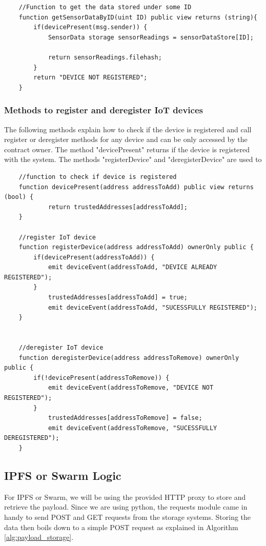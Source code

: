 \documentclass[11pt,openright]{report}
\begin{document}
\begin{verbatim}
    //Function to get the data stored under some ID
    function getSensorDataByID(uint ID) public view returns (string){
        if(devicePresent(msg.sender)) {
            SensorData storage sensorReadings = sensorDataStore[ID];

            return sensorReadings.filehash;
        }
        return "DEVICE NOT REGISTERED";
    }
\end{verbatim}

\subsubsection{Methods to register and deregister IoT devices}
The following methods explain how to check if the device is registered and call register or deregister methods for any device and can be only accessed by the contract owner. 
The method "devicePresent" returns if the device is registered with the system.
The methods "registerDevice" and "deregisterDevice" are used to 
\begin{verbatim}
    //function to check if device is registered
    function devicePresent(address addressToAdd) public view returns (bool) {
            return trustedAddresses[addressToAdd];
    }
    
    //register IoT device
    function registerDevice(address addressToAdd) ownerOnly public {
        if(devicePresent(addressToAdd)) {
            emit deviceEvent(addressToAdd, "DEVICE ALREADY REGISTERED");
        }
            trustedAddresses[addressToAdd] = true;
            emit deviceEvent(addressToAdd, "SUCESSFULLY REGISTERED");
    }
    
    
    //deregister IoT device
    function deregisterDevice(address addressToRemove) ownerOnly public {
        if(!devicePresent(addressToRemove)) {
            emit deviceEvent(addressToRemove, "DEVICE NOT REGISTERED");
        }
            trustedAddresses[addressToRemove] = false;
            emit deviceEvent(addressToRemove, "SUCESSFULLY DEREGISTERED");
    }
\end{verbatim}
\newpage

\subsection{IPFS or Swarm Logic}

For IPFS or Swarm, we will be using the provided HTTP proxy to store and retrieve the payload. Since we are using python, the requests module came in handy to send POST and GET requests from the storage systems. Storing the data then boils down to a simple POST request as explained in Algorithm \ref{alg:payload_storage}.
\end{document}
